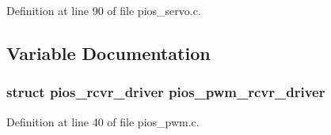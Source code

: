 \-Definition at line 90 of file pios\-\_\-servo.\-c.



\subsection{\-Variable \-Documentation}
\hypertarget{group___p_i_o_s___s_e_r_v_o_ga767a19a3a54afa71399b7467963690df}{
\subsubsection[{pios\-\_\-pwm\-\_\-rcvr\-\_\-driver}]{\setlength{\rightskip}{0pt plus 5cm}struct {\bf pios\-\_\-rcvr\-\_\-driver} {\bf pios\-\_\-pwm\-\_\-rcvr\-\_\-driver}}}\label{group___p_i_o_s___s_e_r_v_o_ga767a19a3a54afa71399b7467963690df}


\-Definition at line 40 of file pios\-\_\-pwm.\-c.

